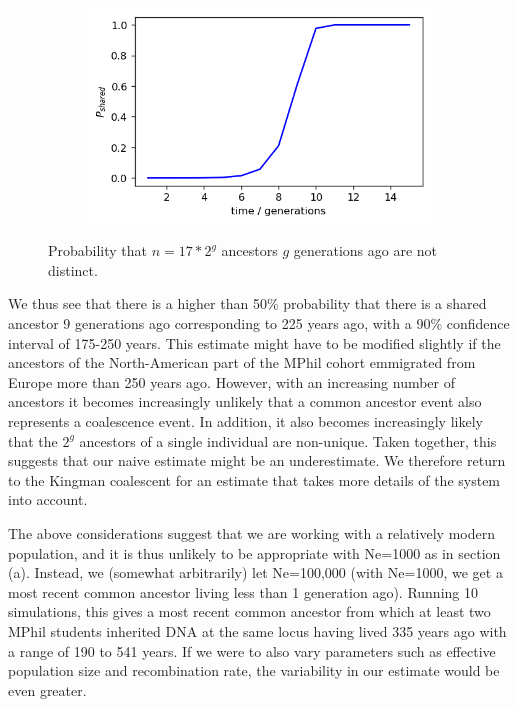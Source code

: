 \documentclass{article}
\begin{document}
\begin{figure}[h]
	\centering
	\begin{subfigure}[t]{0.45\linewidth}
		\centering
		\includegraphics[width = 1.0\linewidth, trim={0 0 0 0}, clip=true]{figures/simple_ancestors.png}
	\end{subfigure}
\caption{Probability that $n = 17*2^g$ ancestors $g$ generations ago are not distinct.}
\label{fig:ngens}
\end{figure}

We thus see that there is a higher than 50\% probability that there is a shared ancestor 9 generations ago corresponding to 225 years ago, with a 90\% confidence interval of 175-250 years. This estimate might have to be modified slightly if the ancestors of the North-American part of the MPhil cohort emmigrated from Europe more than 250 years ago. However, with an increasing number of ancestors it becomes increasingly unlikely that a common ancestor event also represents a coalescence event.  In addition, it also becomes increasingly likely that the $2^g$ ancestors of a single individual are non-unique. Taken together, this suggests that our naive estimate might be an underestimate. We therefore return to the Kingman coalescent for an estimate that takes more details of the system into account.

The above considerations suggest that we are working with a relatively modern population, and it is thus unlikely to be appropriate with Ne=1000 as in section (a). Instead, we (somewhat arbitrarily) let Ne=100,000 (with Ne=1000, we get a most recent common ancestor living less than 1 generation ago).
Running 10 simulations, this gives a most recent common ancestor from which at least two MPhil students inherited DNA at the same locus having lived 335 years ago with a range of 190 to 541 years. If we were to also vary parameters such as effective population size and recombination rate, the variability in our estimate would be even greater.
\end{document}
